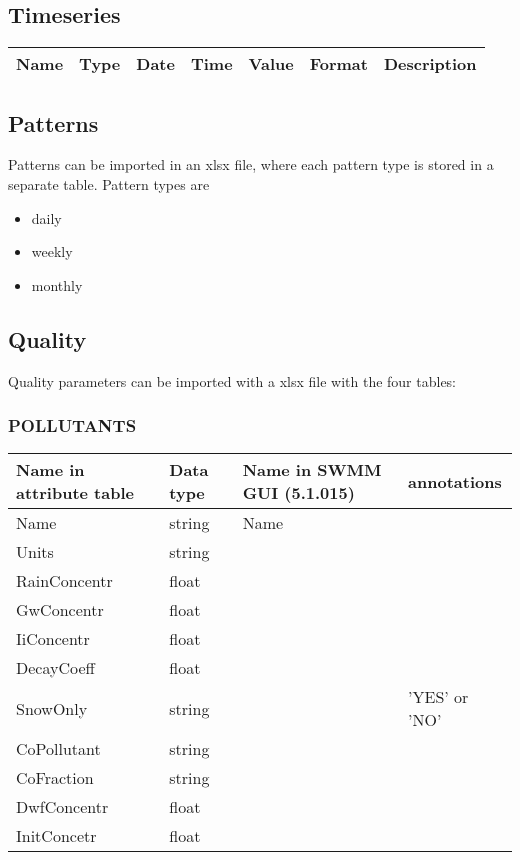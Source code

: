 \documentclass[10pt,a4paper,oneside]{scrbook}
\begin{document}
\subsection{Timeseries}
\begin{tabular}{|p{1.7cm}|p{1.3cm}|P{1.3cm}|P{1.3cm}|P{1.3cm}|P{1.3cm}|P{6cm}|}
\hline 
\textbf{Name} & \textbf{Type} & \textbf{Date} & \textbf{Time} & \textbf{Value} & \textbf{Format} & \textbf{Description}\\ 
\hline
\end{tabular}


\subsection{Patterns}
Patterns can be imported in an xlsx file, 
where each pattern type is stored in a separate table. Pattern types are
\begin{itemize}
\item daily
\item weekly
\item monthly
\end{itemize}


\subsection{Quality}
Quality parameters can be imported with a xlsx file with the four tables: 

\subsubsection{POLLUTANTS}
\begin{tabular}{p{2cm}|p{1.3cm}|P{3cm}|P{7.7cm}}
\hline 
\textbf{Name in attribute table} & \textbf{Data type} & \textbf{Name in SWMM GUI (5.1.015)} & \textbf{annotations}\\ 
\hline 
Name & string & Name & \\
Units & string &  & \\ 
RainConcentr & float &  & \\ 
GwConcentr & float &  & \\ 
IiConcentr & float &  & \\ 
DecayCoeff & float &  & \\ 
SnowOnly & string &  & 'YES' or 'NO' \\ 
CoPollutant & string &  & \\
CoFraction & string &  & \\ 
DwfConcentr & float &  & \\
InitConcetr & float &  & \\ 
\hline
\end{tabular}
\end{document}
